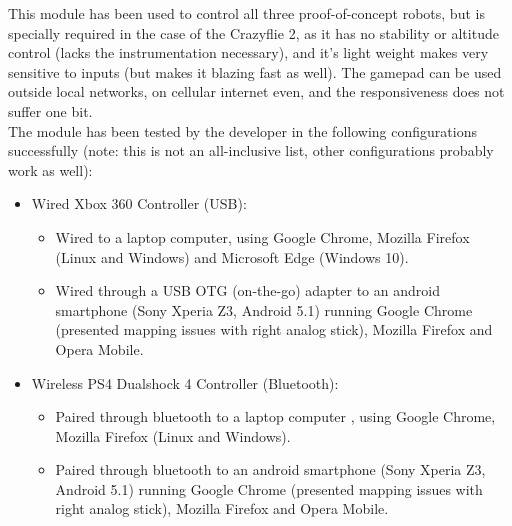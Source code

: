 This module has been used to control all three proof-of-concept robots, but is specially required in the case of the Crazyflie 
2, as it has no stability or altitude control (lacks the instrumentation necessary), and it's light weight makes very 
sensitive to inputs (but makes it blazing fast as well). The gamepad can be used outside local networks, on cellular internet 
even, and the responsiveness does not suffer one bit.\\

The module has been tested by the developer in the following configurations successfully (note: this is not an all-inclusive 
list, other configurations probably work as well):\\
\begin{itemize}
	\item Wired Xbox 360 Controller (USB): 
		\begin{itemize}
			\item Wired to a laptop computer, using Google Chrome, Mozilla Firefox (Linux and Windows) and Microsoft Edge 
			(Windows 10).
			\item Wired through a USB OTG (on-the-go) adapter to an android smartphone (Sony Xperia Z3, Android 5.1) running 
			Google Chrome (presented mapping issues with right analog stick), Mozilla Firefox and Opera Mobile.
		\end{itemize}
	\item Wireless PS4 Dualshock 4 Controller (Bluetooth):
		\begin{itemize}
			\item Paired through bluetooth to a laptop computer , using Google Chrome, Mozilla Firefox (Linux and Windows).
			\item Paired through bluetooth to an android smartphone (Sony Xperia Z3, Android 5.1) running Google Chrome 
			(presented mapping issues with right analog stick), Mozilla Firefox and Opera Mobile.
		\end{itemize}
\end{itemize}
